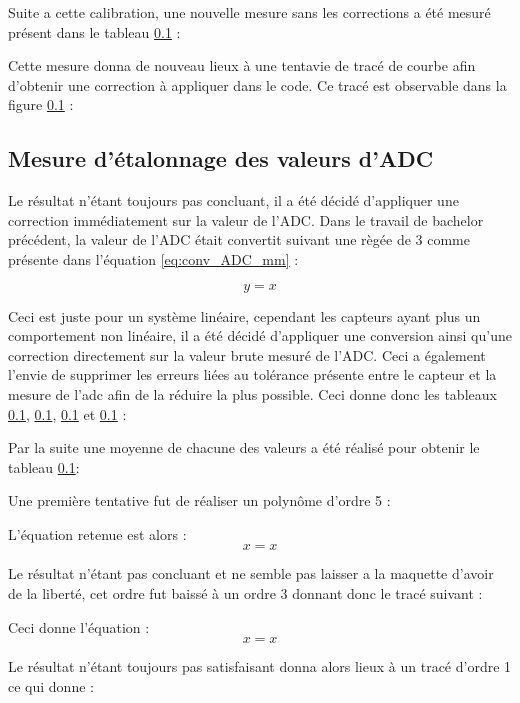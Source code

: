 Suite a cette calibration, une nouvelle mesure sans les corrections a été mesuré présent dans le tableau \ref{} :



Cette mesure donna de nouveau lieux à une tentavie de tracé de courbe afin d'obtenir une correction à appliquer dans le code. Ce tracé est observable dans la figure \ref{} :


\subsection{Mesure d'étalonnage des valeurs d'ADC}
Le résultat n'étant toujours pas concluant, il a été décidé d'appliquer une correction immédiatement sur la valeur de l'ADC. Dans le travail de bachelor précédent, la valeur de l'ADC était convertit suivant une règée de 3 comme présente dans l'équation \ref{eq:conv_ADC_mm} :

\begin{equation}
    y = x
    \label{eq:conv_ADC_mm}
\end{equation}

Ceci est juste pour un système linéaire, cependant les capteurs ayant plus un comportement non linéaire, il a été décidé d'appliquer une conversion ainsi qu'une correction directement sur la valeur brute mesuré de l'ADC. Ceci a également l'envie de supprimer les erreurs liées au tolérance présente entre le capteur et la mesure de l'adc afin de la réduire la plus possible. Ceci donne donc les tableaux \ref{}, \ref{}, \ref{} et \ref{} :



Par la suite une moyenne de chacune des valeurs a été réalisé pour obtenir le tableau \ref{}:


Une première tentative fut de réaliser un polynôme d'ordre 5 :


L'équation retenue est alors :
\begin{equation}
    x = x
\end{equation}


Le résultat n'étant pas concluant et ne semble pas laisser a la maquette d'avoir de la liberté, cet ordre fut baissé à un ordre 3 donnant donc le tracé suivant :


Ceci donne l'équation :
\begin{equation}
    x = x
\end{equation}


Le résultat n'étant toujours pas satisfaisant donna alors lieux à un tracé d'ordre 1 ce qui donne :


